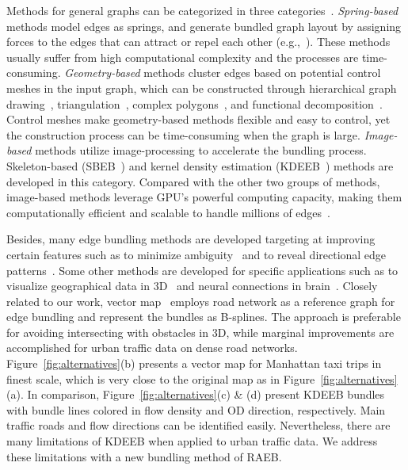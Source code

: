 Methods for general graphs can be categorized in three categories~\cite{zhou2013edge}.
\textit{Spring-based} methods model edges as springs, and generate bundled graph layout by assigning forces to the edges that can attract or repel each other (e.g.,~\cite{holten2009force}).
These methods usually suffer from high computational complexity and the processes are time-consuming.
\textit{Geometry-based} methods cluster edges based on potential control meshes in the input graph, which can be constructed through hierarchical graph drawing~\cite{holten2006hierarchical}, triangulation~\cite{zhou2008energy, lambert2010winding}, complex polygons~\cite{cui2008geometry}, and functional decomposition~\cite{hurter_2018_functional}.
Control meshes make geometry-based methods flexible and easy to control, yet the construction process can be time-consuming when the graph is large. 
\textit{Image-based} methods utilize image-processing to accelerate the bundling process.
Skeleton-based (SBEB~\cite{ersoy2011skeleton}) and kernel density estimation (KDEEB~\cite{hurter2012graph}) methods are developed in this category.
Compared with the other two groups of methods, image-based methods leverage GPU's powerful computing capacity, making them computationally efficient and scalable to handle millions of edges~\cite{van2016cubu, lhuillier2017ffteb}.

Besides, many edge bundling methods are developed targeting at improving certain features such as to minimize ambiguity~\cite{luo2012ambiguity, bach_2017_towards} and to reveal directional edge patterns~\cite{selassie_2011_divided}.
Some other methods are developed for specific applications such as to visualize geographical data in 3D~\cite{lambert20103d, thony2015vector} and neural connections in brain~\cite{2014_bottger_three-d, yang_2017_blockwise}.
Closely related to our work, vector map~\cite{thony2015vector} employs road network as a reference graph for edge bundling and represent the bundles as B-splines.
The approach is preferable for avoiding intersecting with obstacles in 3D, while marginal improvements are accomplished for urban traffic data on dense road networks.
Figure~\ref{fig:alternatives}(b) presents a vector map for Manhattan taxi trips in finest scale, which is very close to the original map as in Figure~\ref{fig:alternatives}(a).
In comparison, Figure~\ref{fig:alternatives}(c) \& (d) present KDEEB bundles with bundle lines colored in flow density and OD direction, respectively.
Main traffic roads and flow directions can be identified easily.
Nevertheless, there are many limitations of KDEEB when applied to urban traffic data.
We address these limitations with a new bundling method of RAEB.